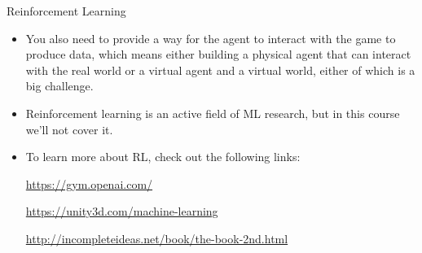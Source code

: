 \documentclass{beamer}
\begin{document}
\begin{frame}{Reinforcement Learning}

\begin{itemize} 
\item You also need to provide a way for the agent to interact with the game to produce data, which means either building a physical agent that can interact with the real world or a virtual agent and a virtual world, either of which is a big challenge. 

\item Reinforcement learning is an active field of ML research, but in this course we'll not cover it.

\item To learn more about RL, check out the following links:

\url{https://gym.openai.com/}

\url{https://unity3d.com/machine-learning}

\url{http://incompleteideas.net/book/the-book-2nd.html}
\end{itemize}

\end{frame}
\end{document}
